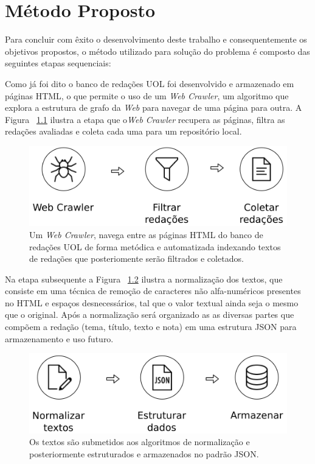 \chapter{Método Proposto}\label{meto}

Para concluir com êxito o desenvolvimento deste trabalho e consequentemente os objetivos propostos, o método utilizado para solução do problema é composto das seguintes etapas sequenciais:

Como já foi dito o banco de redações UOL foi desenvolvido e armazenado em páginas HTML, o que permite o uso de um \textit{Web Crawler}, um algoritmo que explora a estrutura de grafo da \textit{Web} para navegar de uma página para outra. A Figura ~\ref{fig:metodologia_1} ilustra a etapa que o\textit{Web Crawler} recupera as páginas, filtra as redações avaliadas e coleta cada uma para um repositório local.

\begin{figure}[H]
\begin{center}
    \includegraphics[scale=0.75]{figuras/metodologia_1.png}
\end{center}
\caption{Um \textit{Web Crawler}, navega entre as páginas HTML do banco de redações UOL de forma metódica e automatizada indexando textos de redações que posteriomente serão filtrados e coletados.}
\label{fig:metodologia_1}
\end{figure}

Na etapa subsequente a Figura ~\ref{fig:metodologia_2} ilustra a normalização dos textos, que consiste em uma técnica de remoção de caracteres não alfa-numéricos presentes no HTML e espaços desnecessários, tal que o valor textual ainda seja o mesmo que o original. Após a normalização será organizado as as diversas partes que compõem a redação (tema, título, texto e nota) em uma estrutura JSON para armazenamento e uso futuro. 

\begin{figure}[H]
\begin{center}
    \includegraphics[scale=0.75]{figuras/metodologia_2.png}
\end{center}
\caption{Os textos são submetidos aos algoritmos de normalização e posteriormente estruturados e armazenados no padrão JSON.}
\label{fig:metodologia_2}
\end{figure}

